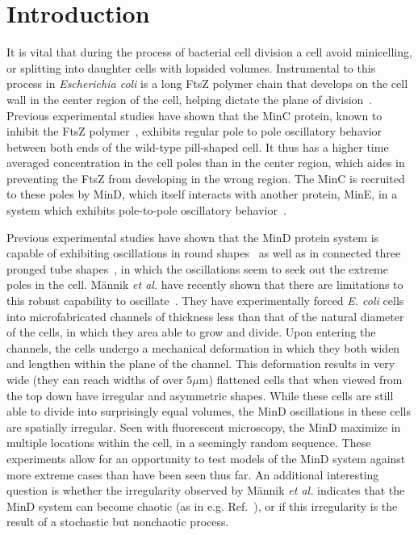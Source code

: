 \documentclass[10pt,letterpaper]{article}
\newcommand\micron{\ensuremath{\mu\text{m}}}
\begin{document}
\section*{Introduction}
It is vital that during the process of bacterial cell
division a cell avoid minicelling, or splitting into daughter cells
with lopsided volumes.  Instrumental to this process in
\emph{Escherichia coli} is a long FtsZ polymer chain that develops on
the cell wall in the center region of the cell, helping dictate the
plane of division~\cite{adams2009bacterial,
  lutkenhaus2007assembly}. Previous experimental studies have shown
that the MinC protein, known to inhibit the FtsZ
polymer~\cite{shen2010examination}, exhibits regular pole to pole
oscillatory behavior between both ends of the wild-type pill-shaped
cell.  It thus has a higher time averaged concentration in the cell
poles than in the center region, which aides in preventing the FtsZ
from developing in the wrong region.  The MinC is recruited to these
poles by MinD, which itself interacts with another protein, MinE, in a
system which exhibits pole-to-pole oscillatory
behavior~\cite{shapiro2009and, yu1999ftsz,
  meacci2005min,huang2003dynamic,kerr2006division,mannik2009bacterial}.

Previous experimental studies have shown that the MinD protein system
is capable of exhibiting oscillations in round
shapes~\cite{corbin2002exploring,fange2006noise} as well as in
connected three pronged tube shapes~\cite{varma2008min}, in which the
oscillations seem to seek out the extreme poles in the cell.
M\"annik \emph{et al.} have recently shown that there are limitations to
this robust capability to
oscillate~\cite{mannik2012robustness,mannik2009bacterial,mannik2010bacteria}. They
have experimentally forced \emph{E. coli} cells into microfabricated
channels of thickness less than that of the natural diameter of the
cells, in which they area able to grow and divide. Upon entering the
channels, the cells undergo a mechanical deformation in which they
both widen and lengthen within the plane of the channel.  This
deformation results in very wide (they can reach widths of over
$5\micron$) flattened cells that when viewed from the top down have
irregular and asymmetric shapes.  While these cells are still able to
divide into surprisingly equal volumes, the MinD oscillations in these
cells are spatially irregular. Seen with fluorescent microscopy, the
MinD maximize in multiple locations within the cell, in a seemingly
random sequence. These experiments allow for an opportunity to test
models of the MinD system against more extreme cases than have been
seen thus far.  An additional interesting question is whether the
irregularity observed by M\"annik \emph{et al.}  indicates that the MinD
system can become chaotic (as in
e.g. Ref.~), or if this irregularity is
the result of a stochastic but nonchaotic process.
%
\end{document}
